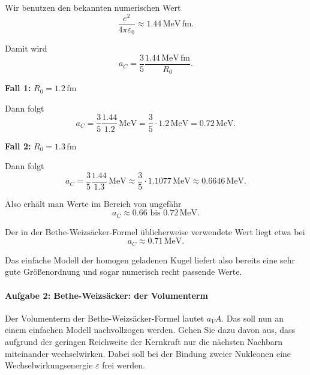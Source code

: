 \documentclass[11pt,a4paper]{scrartcl}
\begin{document}
\begin{enumerate}[label=(\alph*)]
    \begin{solutionbox}
        Wir benutzen den bekannten numerischen Wert
        \[
            \frac{e^2}{4\pi\varepsilon_0}\approx 1.44\,\mathrm{MeV\,fm}.
        \]

        Damit wird
        \[
            a_C=\frac{3}{5}\frac{1.44\,\mathrm{MeV\,fm}}{R_0}.
        \]

        \textbf{Fall 1:} $R_0=1.2\,\mathrm{fm}$

        Dann folgt
        \[
            a_C=\frac{3}{5}\frac{1.44}{1.2}\,\mathrm{MeV}
            =\frac{3}{5}\cdot 1.2\,\mathrm{MeV}
            =0.72\,\mathrm{MeV}.
        \]

        \textbf{Fall 2:} $R_0=1.3\,\mathrm{fm}$

        Dann folgt
        \[
            a_C=\frac{3}{5}\frac{1.44}{1.3}\,\mathrm{MeV}
            \approx \frac{3}{5}\cdot 1.1077\,\mathrm{MeV}
            \approx 0.6646\,\mathrm{MeV}.
        \]

        Also erhält man Werte im Bereich von ungefähr
        \[
            a_C\approx 0.66\text{ bis }0.72\,\mathrm{MeV}.
        \]

        Der in der Bethe-Weizsäcker-Formel üblicherweise verwendete Wert liegt etwa bei
        \[
            a_C\approx 0.71\,\mathrm{MeV}.
        \]

        Das einfache Modell der homogen geladenen Kugel liefert also bereits eine sehr gute Größenordnung und sogar numerisch recht passende Werte.
    \end{solutionbox}

\end{enumerate}

\paragraph{Aufgabe 2: Bethe-Weizsäcker: der Volumenterm}

Der Volumenterm der Bethe-Weizsäcker-Formel lautet $a_VA$.
Das soll nun an einem einfachen Modell nachvollzogen werden.
Gehen Sie dazu davon aus, dass aufgrund der geringen Reichweite der Kernkraft nur die nächsten Nachbarn miteinander wechselwirken.
Dabei soll bei der Bindung zweier Nukleonen eine Wechselwirkungsenergie $\varepsilon$ frei werden.
\end{document}
